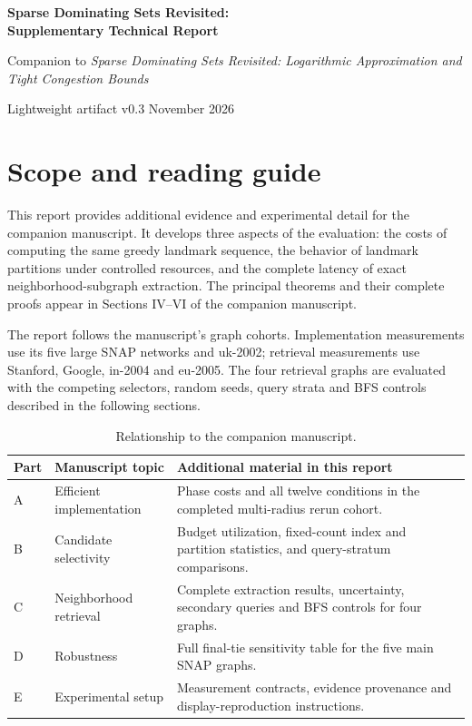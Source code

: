 \documentclass[10pt,letterpaper]{article}
\begin{document}
\thispagestyle{plain}
\begin{center}
{\Large\bfseries Sparse Dominating Sets Revisited:\\[3pt]
Supplementary Technical Report}\par
\vspace{7pt}
{\small Companion to \emph{Sparse Dominating Sets Revisited: Logarithmic Approximation and Tight Congestion Bounds}}\par
\vspace{6pt}
{\small Lightweight artifact v0.3  November 2026}
\end{center}

\section*{Scope and reading guide}
This report provides additional evidence and experimental detail for the companion manuscript. It develops three aspects of the evaluation: the costs of computing the same greedy landmark sequence, the behavior of landmark partitions under controlled resources, and the complete latency of exact neighborhood-subgraph extraction. The principal theorems and their complete proofs appear in Sections IV--VI of the companion manuscript.

The report follows the manuscript's graph cohorts. Implementation measurements use its five large SNAP networks and uk-2002; retrieval measurements use Stanford, Google, in-2004 and eu-2005. The four retrieval graphs are evaluated with the competing selectors, random seeds, query strata and BFS controls described in the following sections.

\begin{table}[H]
\centering\small
\caption{Relationship to the companion manuscript.}
\begin{tabular}{@{}p{.06\linewidth}p{.32\linewidth}p{.54\linewidth}@{}}
\toprule
Part & Manuscript topic & Additional material in this report\\
\midrule
A & Efficient implementation & Phase costs and all twelve conditions in the completed multi-radius rerun cohort.\\
B & Candidate selectivity & Budget utilization, fixed-count index and partition statistics, and query-stratum comparisons.\\
C & Neighborhood retrieval & Complete extraction results, uncertainty, secondary queries and BFS controls for four graphs.\\
D & Robustness & Full final-tie sensitivity table for the five main SNAP graphs.\\
E & Experimental setup & Measurement contracts, evidence provenance and display-reproduction instructions.\\
\bottomrule
\end{tabular}
\end{table}
\end{document}

